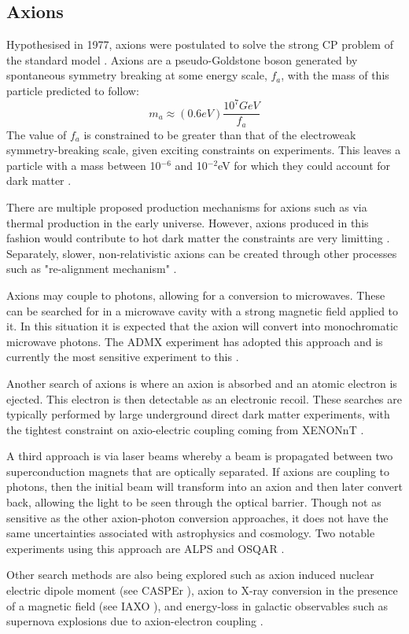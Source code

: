 \subsection{Axions}
\par
Hypothesised in 1977, axions were postulated to solve the strong CP problem of the standard model \cite{axion_origins_ref}.
Axions are a pseudo-Goldstone boson generated by spontaneous symmetry breaking at some energy scale, $f_a$, with the mass of this particle predicted to follow:
\begin{equation}
    m_a \approx (0.6eV)\frac{10^7 GeV}{f_a}
\end{equation}
The value of $f_a$ is constrained to be greater than that of the electroweak symmetry-breaking scale, given exciting constraints on experiments.
This leaves a particle with a mass between 10${}^{-6}$ and 10${}^{-2}$eV for which they could account for dark matter \cite{axions_ref}.
\par
There are multiple proposed production mechanisms for axions such as via thermal production in the early universe.
However, axions produced in this fashion would contribute to hot dark matter the constraints are very limitting \cite{hot_axions_ref}.
Separately, slower, non-relativistic axions can be created through other processes such as "re-alignment mechanism" \cite{cold_axion_ref}.
\par
Axions may couple to photons, allowing for a conversion to microwaves.
These can be searched for in a microwave cavity with a strong magnetic field applied to it.
In this situation it is expected that the axion will convert into monochromatic microwave photons.
The ADMX experiment has adopted this approach and is currently the most sensitive experiment to this \cite{admx_experiment_ref}.
\par
Another search of axions is where an axion is absorbed and an atomic electron is ejected.
This electron is then detectable as an electronic recoil.
These searches are typically performed by large underground direct dark matter experiments, with the tightest constraint on axio-electric coupling coming from XENONnT \cite{xenonnt_sr1_er_ref}.
\par
A third approach is via laser beams whereby a beam is propagated between two superconduction magnets that are optically separated.
If axions are coupling to photons, then the initial beam will transform into an axion and then later convert back, allowing the light to be seen through the optical barrier.
Though not as sensitive as the other axion-photon conversion approaches, it does not have the same uncertainties associated with astrophysics and cosmology.
Two notable experiments using this approach are ALPS \cite{alps_axion_result_ref} and OSQAR \cite{osqar_axion_result_ref}. 
\par
Other search methods are also being explored such as axion induced nuclear electric dipole moment (see CASPEr \cite{casper_experiment_ref}), axion to X-ray conversion in the presence of a magnetic field (see IAXO \cite{iaxo_experiment_ref}), and energy-loss in galactic observables such as supernova explosions due to axion-electron coupling \cite{axions_from_supernova_ref}.

